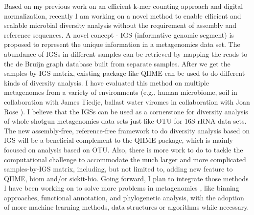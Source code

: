 \documentclass[10pt,a4paper,sans]{moderncv}        %
\begin{document}
Based on my previous work on an efficient k-mer counting approach and digital normalization, 
recently I am working on a novel method to enable efficient and scalable microbial diversity 
analysis  without the requirement of assembly and reference sequences. A novel concept - IGS
 (informative genomic segment) is proposed to represent the unique information in a metagenomics 
 data set.  The abundance of IGSs in different samples can be retrieved by mapping the reads to 
 the de Bruijn graph database built from separate samples. After we get the samples-by-IGS 
 matrix, existing package like QIIME can be used to do different kinds of diversity analysis. I have 
 evaluated this method on multiple metagenomes from a variety of environments (e.g., human 
 microbiome,  soil in collaboration with James Tiedje, ballast water viromes in 
 collaboration with Joan Rose ). I believe that the IGSs can be used as a cornerstone for diversity 
 analysis of whole shotgun metagenomics data sets just like OTU for 16S rRNA data sets. The new assembly-free, 
 reference-free framework to do diversity analysis based on IGS will be a beneficial complement 
 to the QIIME package, which is mainly focused on analysis based on OTU.  Also, there is more 
 work to do to tackle the computational challenge to accommodate the much larger and more 
 complicated samples-by-IGS matrix, including, but not limited to, adding new feature to QIIME, 
 biom and/or sickit-bio.   Going forward, I plan to integrate those methods I have been working 
 on to solve more problems in metagenomics , like binning approaches, functional annotation, 
 and phylogenetic analysis, with the adoption of more machine learning methods, data structures 
 or algorithms while necessary.
\end{document}
